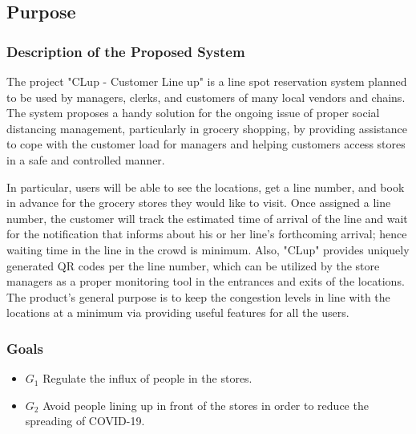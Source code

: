 \subsection{Purpose}

\subsubsection{Description of the Proposed System}
The project "CLup - Customer Line up" is a line spot reservation system planned to be used by managers, clerks, and customers of many local vendors and chains.
The system proposes a handy solution for the ongoing issue of proper social distancing management, particularly in grocery shopping, by providing assistance to cope with the customer load for managers and helping customers access stores in a safe and controlled manner.

In particular, users will be able to see the locations, get a line number, and book in advance for the grocery stores they would like to visit.
Once assigned a line number, the customer will track the estimated time of arrival of the line and wait for the notification that informs about his or her line's forthcoming arrival; hence waiting time in the line in the crowd is minimum.
Also, "CLup" provides uniquely generated QR codes per the line number, which can be utilized by the store managers as a proper monitoring tool in the entrances and exits of the locations.
The product's general purpose is to keep the congestion levels in line with the locations at a minimum via providing useful features for all the users.




\subsubsection{Goals}

\begin{itemize}
    \item \textbf{$G_{1}$} Regulate the influx of people in the stores.
    \item \textbf{$G_{2}$} Avoid people lining up in front of the stores in order to reduce the spreading of COVID-19.
\end{itemize}


